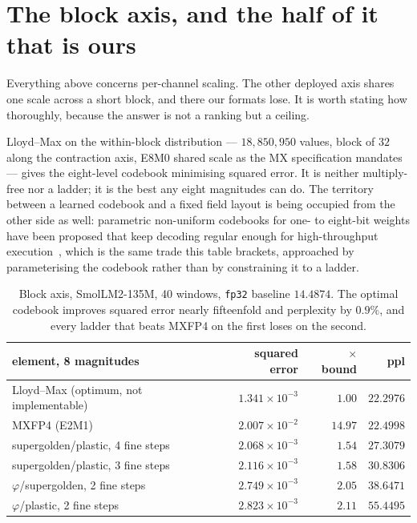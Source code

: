 \documentclass[11pt]{article}
\theoremstyle{definition}
\begin{document}
\section{The block axis, and the half of it that is ours}
\label{sec:blockbound}

Everything above concerns per-channel scaling. The other deployed axis shares
one scale across a short block, and there our formats lose. It is worth stating
how thoroughly, because the answer is not a ranking but a ceiling.

Lloyd--Max on the within-block distribution --- $18{,}850{,}950$ values, block of
$32$ along the contraction axis, E8M0 shared scale as the MX specification
mandates --- gives the eight-level codebook minimising squared error. It is
neither multiply-free nor a ladder; it is the best any eight magnitudes can do.
The territory between a learned codebook and a fixed field layout is being
occupied from the other side as well: parametric non-uniform codebooks for one- to
eight-bit weights have been proposed that keep decoding regular enough for
high-throughput execution~\cite{gao2026cubicquant}, which is the same trade this
table brackets, approached by parameterising the codebook rather than by
constraining it to a ladder.

\begin{table}[t]\centering
\caption{Block axis, SmolLM2-135M, 40 windows, \texttt{fp32} baseline $14.4874$.
The optimal codebook improves squared error nearly fifteenfold and perplexity by
$0.9\%$, and every ladder that beats MXFP4 on the first loses on the second.}
\label{tab:blockbound}
\begin{tabular}{lrrr}
\toprule
element, 8 magnitudes & squared error & $\times$ bound & ppl \\
\midrule
Lloyd--Max (optimum, not implementable) & $1.341\!\times\!10^{-3}$ & $1.00$ & $\mathbf{22.2976}$ \\
MXFP4 (E2M1)                            & $2.007\!\times\!10^{-2}$ & $14.97$ & $\mathbf{22.4998}$ \\
supergolden/plastic, 4 fine steps       & $2.068\!\times\!10^{-3}$ & $1.54$ & $27.3079$ \\
supergolden/plastic, 3 fine steps       & $2.116\!\times\!10^{-3}$ & $1.58$ & $30.8306$ \\
$\varphi$/supergolden, 2 fine steps     & $2.749\!\times\!10^{-3}$ & $2.05$ & $38.6471$ \\
$\varphi$/plastic, 2 fine steps         & $2.823\!\times\!10^{-3}$ & $2.11$ & $55.4495$ \\
\bottomrule
\end{tabular}
\end{table}
\end{document}
